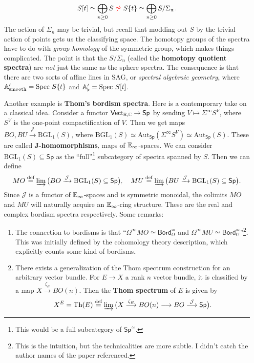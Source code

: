 \begin{example}
\[        S[t] \simeq  \bigoplus _{ n \geq 0}S \ {\color{red}\not \simeq }\ S \{t\} \simeq  \bigoplus _{n\geq 0}S /\Sigma_n .
    \] The action of $\Sigma_n $ may be trivial, but recall that modding out $S$ by the trivial action of points gets us the classifying space. The homotopy groups of the spectra have to do with \emph{group homology} of the symmetric group, which makes things complicated. The point is that the $S/ \Sigma_n $ (called the \textbf{homotopy quotient spectra}) are \emph{not} just the same as the sphere spectra.
    The consequence is that there are two sorts of affine lines in SAG, or \emph{spectral algebraic geometry}, where $\mathbb{A}' _{\mathrm{smooth}}= \mathrm{Spec} \ S \{t\} $ and $\mathbb{A}' _{\flat}= \mathrm{Spec}\ S[t]$.
\end{example}
\begin{example}
    Another example is \textbf{Thom's bordism spectra}. Here is a contemporary take on a classical idea. Consider a functor $\mathsf{Vect} _{\mathbb{R},\mathbb{C}}\to \mathsf{Sp} $ by sending $V \mapsto \Sigma^{\infty}S^V$, where $S^V$ is the one-point compactification of $V$. Then we get maps $BO,BU \xrightarrow{\mathcal{J} } \mathrm{BGL}_1(S)$, where $\mathrm{BGL}_1(S) \simeq  \mathrm{Aut}_{\mathsf{Sp} }(\Sigma^{\infty}S^V) \simeq  \mathrm{Aut}_{\mathsf{Sp} }(S)$. These are called $\mathbf J$\textbf{-homomorphisms}, maps of $\mathbb{E}_{\infty}$-spaces. We can consider $\mathrm{BGL}_1(S) \subseteq \mathsf{Sp} $ as the ``full''\footnote{This would be a full subcategory of $\mathsf{Sp } ^{\simeq }$.} subcategory of spectra spanned by $S$. Then we can define \[
        MO \overset{\text{def} }{=} \varinjlim \big( BO \xrightarrow{\mathcal{J} } \mathrm{BGL_1}(S) \subseteq \mathsf{Sp} \big) ,\quad MU \overset{\text{def} }{=} \varinjlim \big( BU \xrightarrow{\mathcal{J} } \mathrm{BGL_1}(S) \subseteq \mathsf{Sp} \big).
    \] Since $\mathcal{J} $ is a functor of $\mathbb{E}_{\infty}$-spaces and is symmetric monoidal, the colimits $MO$ and $MU$ will naturally acquire an $\mathbb{E}_{\infty}$-ring structure. These are the real and complex bordism spectra respectively. Some remarks:
    \begin{enumerate}[label=(\arabic*)]
    \setlength\itemsep{-.2em}
        \item The connection to bordisms is that ``$\Omega^{\infty}MO \simeq \mathsf{Bord} _O ^{\simeq }$ and $\Omega^{\infty}MU \simeq \mathsf{Bord} _U ^{\simeq }$''\footnote{This is the intuition, but the technicalities are more subtle. I didn't catch the author names of the paper referenced.}. This was initially defined by the cohomology theory description, which explicitly counts some kind of bordisms.
        \item There exists a generalization of the Thom spectrum construction for an arbitrary vector bundle. For $E \to X$ a rank $n$ vector bundle, it is classified by a map $X \xrightarrow{\zeta_E} BO(n)$. Then the \textbf{Thom spectrum} of $E$ is given by \[
                X^E = \mathrm{Th}(E) \overset{\text{def} }{=} \varinjlim\big( X \overset{\zeta_E}{\longrightarrow} BO(n) \longrightarrow BO \overset{\mathcal{J} }{\longrightarrow} \mathsf{Sp} \big).
        \] 
    \end{enumerate}
\end{example}

